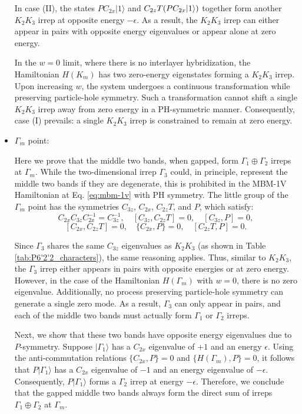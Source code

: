 \begin{itemize}
In case (II), the states \(PC_{2x} |1\rangle\) and \(C_{2z}T \qty(PC_{2x} |1\rangle)\) together form another \(K_2K_3\) irrep at opposite energy \(-\epsilon\). As a result, the \(K_2K_3\) irrep can either appear in pairs with opposite energy eigenvalues or appear alone at zero energy.

In the \(w = 0\) limit, where there is no interlayer hybridization, the Hamiltonian \(H(K_m)\) has two zero-energy eigenstates forming a \(K_2K_3\) irrep. Upon increasing \(w\), the system undergoes a continuous transformation while preserving particle-hole symmetry. Such a transformation cannot shift a single \(K_2K_3\) irrep away from zero energy in a PH-symmetric manner. Consequently, case (I) prevails: a single \(K_2K_3\) irrep is constrained to remain at zero energy.

\item $\Gamma_m$ point:

Here we prove that the middle two bands, when gapped, form \(\Gamma_1 \oplus \Gamma_2\) irreps at \(\Gamma_m\). While the two-dimensional irrep \(\Gamma_3\) could, in principle, represent the middle two bands if they are degenerate, this is prohibited in the MBM-1V Hamiltonian at Eq. \eqref{eq:mbm-1v} with PH symmetry. The little group of the \(\Gamma_m\) point has the symmetries \(C_{3z}\), \(C_{2x}\), \(C_{2z}T\), and \(P\), which satisfy:
\begin{equation} \label{eq:proof_flatbands_GMm_point_1}
C_{2x}C_{3z}C_{2x}^{-1} = C_{3z}^{-1}, \quad [C_{3z}, C_{2z}T] = 0, \quad [C_{3z}, P] = 0,
\end{equation}
\begin{equation} \label{eq:proof_flatbands_GMm_point_2}
[C_{2x}, C_{2z}T] = 0, \quad \{C_{2x}, P\} = 0, \quad [C_{2z}T, P] = 0.
\end{equation}

Since \( \Gamma_3 \) shares the same \( C_{3z} \) eigenvalues as \( K_2K_3 \) (as shown in Table \ref{tab:P6'2'2_characters}), the same reasoning applies. Thus, similar to \( K_2K_3 \), the \( \Gamma_3 \) irrep either appears in pairs with opposite energies or at zero energy. However, in the case of the Hamiltonian \( H(\Gamma_m) \) with \( w = 0 \), there is no zero eigenvalue. Additionally, no process preserving particle-hole symmetry can generate a single zero mode. As a result, \( \Gamma_3 \) can only appear in pairs, and each of the middle two bands must actually form \( \Gamma_1 \) or \( \Gamma_2 \) irreps.

Next, we show that these two bands have opposite energy eigenvalues due to \( P \)-symmetry. Suppose \( |\Gamma_1\rangle \) has a \( C_{2x} \) eigenvalue of \( +1 \) and an energy \( \epsilon \). Using the anti-commutation relations \( \{C_{2x}, P\} = 0 \) and \( \{H(\Gamma_m), P\} = 0 \), it follows that \( P |\Gamma_1\rangle \) has a \( C_{2x} \) eigenvalue of \( -1 \) and an energy eigenvalue of \( -\epsilon \). Consequently, \( P |\Gamma_1\rangle \) forms a \( \Gamma_2 \) irrep at energy \( -\epsilon \). Therefore, we conclude that the gapped middle two bands always form the direct sum of irreps \( \Gamma_1 \oplus \Gamma_2 \) at \( \Gamma_m \).


\end{itemize}
